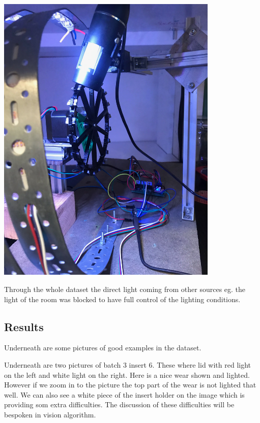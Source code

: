 \documentclass{article}
\begin{document}
\includegraphics[width=4.166667in, keepaspectratio=true]{./ZimFiles_files/Vision/Dataset/automated_datasets/2_created_datasets/2_Spaghetti_dataset/IMG_9296.jpeg}



Through the whole dataset the direct light coming from other sources eg. the light of the room was blocked to have full control of the lighting conditions.



\subsection{Results}

Underneath are some pictures of good examples in the dataset.



Underneath are two pictures of batch 3 insert 6. These where lid with red light on the left and white light on the right. Here is a nice wear shown and lighted. However if we zoom in to the picture the top part of the wear is not lighted that well. We can also see a white piece of the insert holder on the image which is providing som extra difficulties. The discussion of these difficulties will be bespoken in vision algorithm.
\end{document}
